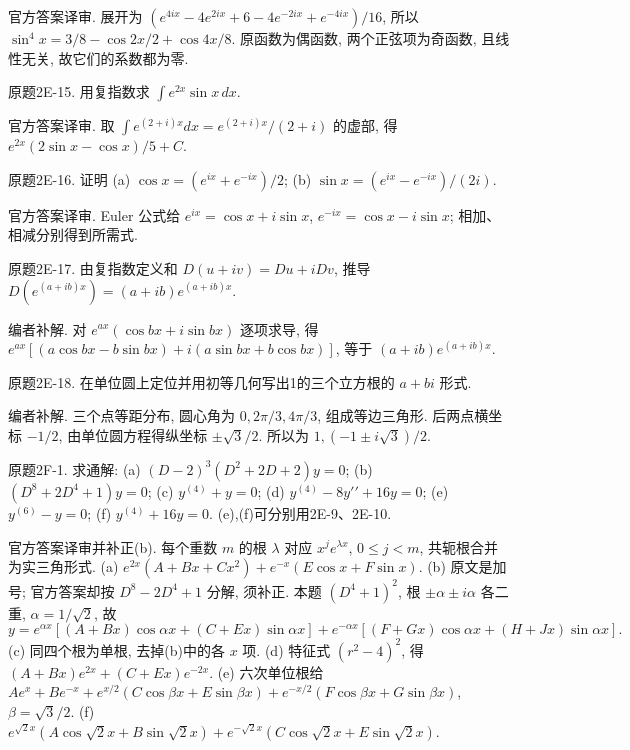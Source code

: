 \begin{solution}
官方答案译审. 展开为 $(e^{4ix}-4e^{2ix}+6-4e^{-2ix}+e^{-4ix})/16$, 所以 $\sin^4x=3/8-\cos2x/2+\cos4x/8$. 原函数为偶函数, 两个正弦项为奇函数, 且线性无关, 故它们的系数都为零.
\end{solution}
\begin{exercise}\label{cw:bank-2E-15}
原题2E-15. 用复指数求 $\int e^{2x}\sin x\,dx$.
\end{exercise}
\begin{solution}
官方答案译审. 取 $\int e^{(2+i)x}dx=e^{(2+i)x}/(2+i)$ 的虚部, 得 $e^{2x}(2\sin x-\cos x)/5+C$.
\end{solution}
\begin{exercise}\label{cw:bank-2E-16}
原题2E-16. 证明 (a) $\cos x=(e^{ix}+e^{-ix})/2$; (b) $\sin x=(e^{ix}-e^{-ix})/(2i)$.
\end{exercise}
\begin{solution}
官方答案译审. Euler 公式给 $e^{ix}=\cos x+i\sin x$, $e^{-ix}=\cos x-i\sin x$; 相加、相减分别得到所需式.
\end{solution}
\begin{exercise}\label{cw:bank-2E-17}
原题2E-17. 由复指数定义和 $D(u+iv)=Du+iDv$, 推导 $D(e^{(a+ib)x})=(a+ib)e^{(a+ib)x}$.
\end{exercise}
\begin{solution}
编者补解. 对 $e^{ax}(\cos bx+i\sin bx)$ 逐项求导, 得 $e^{ax}[(a\cos bx-b\sin bx)+i(a\sin bx+b\cos bx)]$, 等于 $(a+ib)e^{(a+ib)x}$.
\end{solution}
\begin{exercise}\label{cw:bank-2E-18}
原题2E-18. 在单位圆上定位并用初等几何写出1的三个立方根的 $a+bi$ 形式.
\end{exercise}
\begin{solution}
编者补解. 三个点等距分布, 圆心角为 $0,2\pi/3,4\pi/3$, 组成等边三角形. 后两点横坐标 $-1/2$, 由单位圆方程得纵坐标 $\pm\sqrt3/2$. 所以为 $1,(-1\pm i\sqrt3)/2$.
\end{solution}
\begin{exercise}\label{cw:bank-2F-1}
原题2F-1. 求通解: (a) $(D-2)^3(D^2+2D+2)y=0$; (b) $(D^8+2D^4+1)y=0$; (c) $y^{(4)}+y=0$; (d) $y^{(4)}-8y\prime\prime+16y=0$; (e) $y^{(6)}-y=0$; (f) $y^{(4)}+16y=0$. (e),(f)可分别用2E-9、2E-10.
\end{exercise}
\begin{solution}
官方答案译审并补正(b). 每个重数 $m$ 的根 $\lambda$ 对应 $x^je^{\lambda x}$, $0\le j<m$, 共轭根合并为实三角形式. (a) $e^{2x}(A+Bx+Cx^2)+e^{-x}(E\cos x+F\sin x)$. (b) 原文是加号; 官方答案却按 $D^8-2D^4+1$ 分解, 须补正. 本题 $(D^4+1)^2$, 根 $\pm\alpha\pm i\alpha$ 各二重, $\alpha=1/\sqrt2$, 故\[y=e^{\alpha x}[(A+Bx)\cos\alpha x+(C+Ex)\sin\alpha x]+e^{-\alpha x}[(F+Gx)\cos\alpha x+(H+Jx)\sin\alpha x].\](c) 同四个根为单根, 去掉(b)中的各 $x$ 项. (d) 特征式 $(r^2-4)^2$, 得 $(A+Bx)e^{2x}+(C+Ex)e^{-2x}$. (e) 六次单位根给 $Ae^x+Be^{-x}+e^{x/2}(C\cos\beta x+E\sin\beta x)+e^{-x/2}(F\cos\beta x+G\sin\beta x)$, $\beta=\sqrt3/2$. (f) $e^{\sqrt2x}(A\cos\sqrt2x+B\sin\sqrt2x)+e^{-\sqrt2x}(C\cos\sqrt2x+E\sin\sqrt2x)$.
\end{solution}
